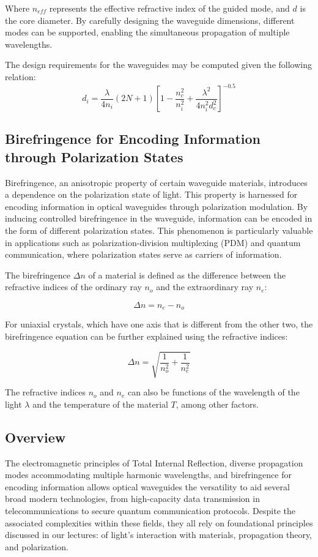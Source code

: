 \documentclass[10pt]{article}
\begin{document}
Where $n_{eff}$ represents the effective refractive index of the guided mode, and
$d$ is the core diameter. By carefully designing the waveguide dimensions, different modes can be supported, enabling the simultaneous propagation of multiple wavelengths.

The design requirements for the waveguides may be computed given the following relation:
\begin{equation}
    d_i = \frac{\lambda}{4n_i}(2N + 1)\left[1 - \frac{n_c^2}{n_i^2} + \frac{\lambda^2}{4n_i^2d_c^2}\right]^{-0.5}
\end{equation}

\subsection{Birefringence for Encoding Information through Polarization States}

Birefringence, an anisotropic property of certain waveguide materials, introduces a dependence on the polarization state of light. This property is harnessed for encoding information in optical waveguides through polarization modulation.
By inducing controlled birefringence in the waveguide, information can be encoded in the form of different polarization states. This phenomenon is particularly valuable in applications such as polarization-division multiplexing (PDM) and quantum communication, where polarization states serve as carriers of information.

The birefringence \(\Delta n\) of a material is defined as the difference between the refractive indices of the ordinary ray \(n_o\) and the extraordinary ray \(n_e\):

\[
    \Delta n = n_e - n_o
    \]
    
    For uniaxial crystals, which have one axis that is different from the other two, the birefringence equation can be further explained using the refractive indices:
    
    \[
        \Delta n = \sqrt{\frac{1}{n_o^2} + \frac{1}{n_e^2}}
        \]
        
        The refractive indices \(n_o\) and \(n_e\) can also be functions of the wavelength of the light \(\lambda\) and the temperature of the material \(T\), among other factors.
        
        
        \subsection{Overview}
        The electromagnetic principles of Total Internal Reflection, diverse propagation modes accommodating multiple harmonic wavelengths, 
        and birefringence for encoding information allows optical waveguides the versatility to aid several broad modern technologies, 
        from high-capacity data transmission in telecommunications to secure quantum communication protocols. Despite the associated complexities within these fields, 
        they all rely on foundational principles discussed in our lectures: of light's interaction with materials, propagation theory, and polarization.
        
\end{document}
